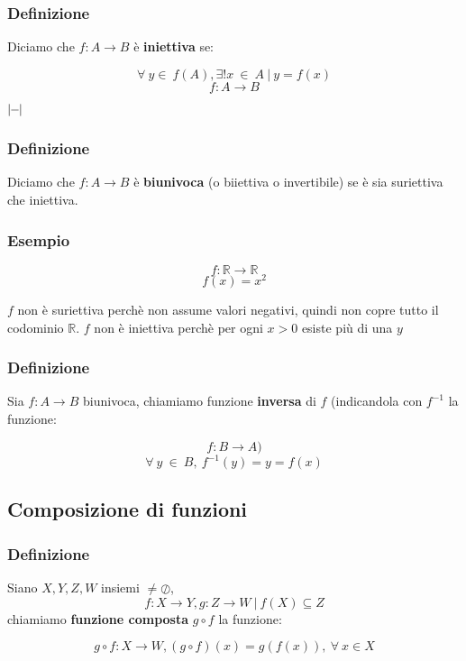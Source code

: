 \subsubsection*{Definizione}
Diciamo che $f:A\rightarrow B$ è \textbf{iniettiva} se:
\begin{large}
\[
    \forall\ y \in\ f(A), \exists! x\ \in\ A\ |\ y = f(x)    
\]
\[
    f:A \rightarrow B    
\]
\end{large}
\vspace{-7ex}
\begin{center}
\begin{small}
    \hspace{0.5cm}$|\text{\hspace{-0.1cm}}-\text{\hspace{-0.1cm}}|$
\end{small}
\end{center}
\subsubsection*{Definizione}
Diciamo che $f:A\rightarrow B$ è \textbf{biunivoca} (o biiettiva o invertibile) se è sia suriettiva che iniettiva.

\subsubsection*{Esempio}
\[f: \mathbb{R} \rightarrow \mathbb{R}\]
\[f(x) = x^{2}\]

$f$ non è suriettiva perchè non assume valori negativi, quindi non copre tutto il codominio $\mathbb{R}$.
$f$ non è iniettiva perchè per ogni $x > 0$ esiste più di una $y$

\subsubsection*{Definizione}
Sia $f: A\rightarrow B$ biunivoca, chiamiamo funzione \textbf{inversa} di $f$ (indicandola con $f^{-1}$ la funzione:
\begin{Large}
\[
    f:B \rightarrow A)
\]
\[
    \forall\ y\ \in\ B,\ f^{-1}(y) = y = f(x)    
\]
\end{Large}
\subsection{Composizione di funzioni}
\subsubsection*{Definizione}
    Siano $X,Y,Z,W$ insiemi $\neq \oslash$,
    \[f:X \rightarrow Y, g:Z\rightarrow W\ |\ f(X) \subseteq Z\]
    chiamiamo \textbf{funzione composta} $g \circ f$ la funzione:
    \begin{Large}
    \[
        g \circ f: X \rightarrow W, (g \circ f)(x) = g(f(x)),\ \forall\ x \in X 
    \]
    \end{Large}
